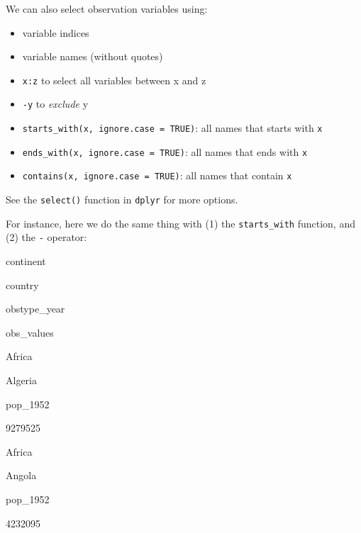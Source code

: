 \documentclass[]{book}
\newenvironment{Shaded}{\begin{snugshade}}{\end{snugshade}}
\newcommand{\CommentTok}[1]{\textcolor[rgb]{0.56,0.35,0.01}{\textit{#1}}}
\newcommand{\KeywordTok}[1]{\textcolor[rgb]{0.13,0.29,0.53}{\textbf{#1}}}
\newcommand{\NormalTok}[1]{#1}
\newcommand{\OperatorTok}[1]{\textcolor[rgb]{0.81,0.36,0.00}{\textbf{#1}}}
\newcommand{\StringTok}[1]{\textcolor[rgb]{0.31,0.60,0.02}{#1}}
\providecommand{\tightlist}{%
  \setlength{\itemsep}{0pt}\setlength{\parskip}{0pt}}
\begin{document}
We can also select observation variables using:

\begin{itemize}
\tightlist
\item
  variable indices
\item
  variable names (without quotes)
\item
  \texttt{x:z} to select all variables between x and z
\item
  \texttt{-y} to \emph{exclude} y
\item
  \texttt{starts\_with(x,\ ignore.case\ =\ TRUE)}: all names that starts with \texttt{x}
\item
  \texttt{ends\_with(x,\ ignore.case\ =\ TRUE)}: all names that ends with \texttt{x}
\item
  \texttt{contains(x,\ ignore.case\ =\ TRUE)}: all names that contain \texttt{x}
\end{itemize}

See the \texttt{select()} function in \texttt{dplyr} for more options.

For instance, here we do the same thing with (1) the \texttt{starts\_with} function, and (2) the \texttt{-} operator:

\begin{Shaded}
\end{Shaded}

continent

country

obstype\_year

obs\_values

Africa

Algeria

pop\_1952

9279525

Africa

Angola

pop\_1952

4232095
\end{document}
